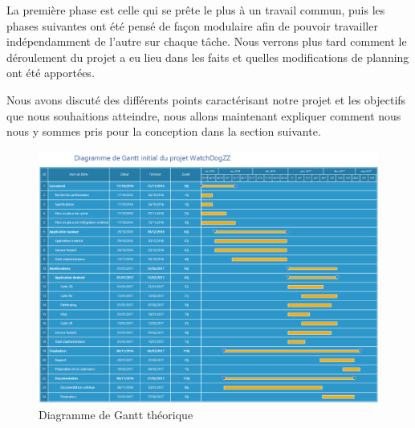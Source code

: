 La première phase est celle qui se prête le plus à un travail commun, puis les phases suivantes ont été pensé de façon modulaire afin de pouvoir travailler indépendamment de l’autre sur chaque tâche. Nous verrons plus tard comment le déroulement du projet a eu lieu dans les faits et quelles modifications de planning ont été apportées.

Nous avons discuté des différents points caractérisant notre projet et les objectifs que nous souhaitions atteindre, nous allons maintenant expliquer comment nous nous y sommes pris pour la conception dans la section suivante.

\begin{landscape}
    \begin{figure}[h]
        \centering
        \includegraphics[height=\textwidth]{../gantt_initial.png}
        \caption{Diagramme de Gantt théorique}
        \label{ganttinit}
    \end{figure}
\end{landscape}
